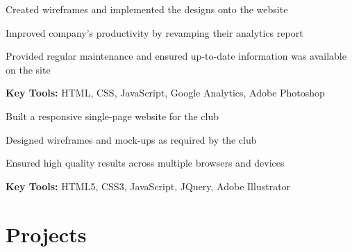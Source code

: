 \documentclass[letterpaper]{deedy-resume} %
\begin{document}
\begin{minipage}[t]{0.66\textwidth}

{\fontsize{11}{13}\selectfont
\begin{tightitemize}
\item Created wireframes and implemented the designs onto the website
\item Improved company’s productivity by revamping their analytics report
\item Provided regular maintenance and ensured up-to-date information was available on the site
\end{tightitemize}
\textbf{Key Tools:} HTML, CSS, JavaScript, Google Analytics, Adobe Photoshop }
\sectionspace %


{\fontsize{11}{13}\selectfont
\begin{tightitemize}
\item Built a responsive single-page website for the club
\item Designed wireframes and mock-ups as required by the club
\item Ensured high quality results across multiple browsers and devices
\end{tightitemize}
\textbf{Key Tools:}  HTML5, CSS3, JavaScript, JQuery, Adobe Illustrator}

\sectionspace %


\section{Projects}


\end{minipage}
\end{document}
